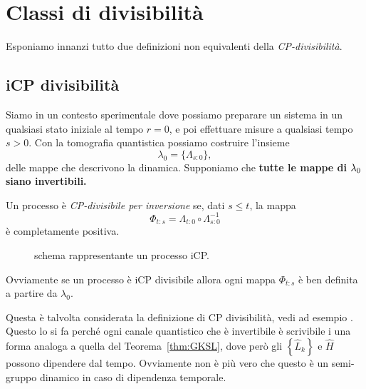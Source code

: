 \documentclass[a4]{article}
\begin{document}
\section{Classi di divisibilità}
Esponiamo innanzi tutto due definizioni non equivalenti della \emph{CP-divisibilità}.

\subsection{iCP divisibilità}
Siamo in un contesto sperimentale dove possiamo preparare un sistema in un qualsiasi
stato iniziale al tempo \(r=0\), e poi effettuare misure a qualsiasi tempo \(s>0\).
Con la tomografia  quantistica  possiamo costruire  l'insieme
\[  \lambda_0 = \{\Lambda_{s\colon0}\}, \]
delle mappe che descrivono la dinamica. Supponiamo che \textbf{tutte le mappe di
\(\boldmath{\lambda_0}\) siano invertibili.}
\begin{defn}
Un processo è \emph{CP-divisibile per inversione} se, dati \(s \le  t\), la mappa
\[\Phi_{t\colon s} = \Lambda_{t\colon0} \circ \Lambda^{-1}_{s\colon0}\]
è completamente positiva.
\end{defn}
\begin{figure}
	\centering
	\resizebox{0.4\textwidth}{!}{}
	\caption{schema rappresentante un processo iCP.}
\end{figure}
Ovviamente se un processo è iCP divisibile allora ogni mappa \(\Phi_{t\colon s}\) è
ben definita a partire da \(\lambda_0\).

Questa è talvolta considerata la definizione di CP divisibilità, vedi ad esempio
\cite{breuer2016colloquium}. Questo lo si fa perché ogni canale quantistico che
è invertibile è scrivibile i una forma analoga a quella del Teorema~\ref{thm:GKSL},
dove però gli \(\left\{\hat{L}_k\right\}\) e \(\hat{H}\) possono dipendere dal tempo.
Ovviamente non è più vero che questo è un semi-gruppo dinamico in caso di dipendenza
temporale.
\end{document}
